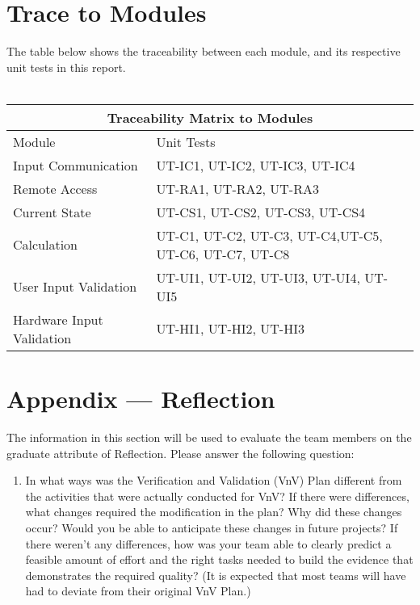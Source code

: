 \documentclass[12pt, titlepage]{article}
\begin{document}
\section{Trace to Modules}		
The table below shows the traceability between each module, and its respective unit tests in this report.\\
\\
\begin{tabular}{ |p{5cm}||p{5cm}| }
  \hline
  \multicolumn{2}{|c|}{Traceability Matrix to Modules} \\
  \hline
  Module & Unit Tests \\
  \hline
  Input Communication   & UT-IC1, UT-IC2, UT-IC3, UT-IC4  \\ \hline
  Remote Access   & UT-RA1, UT-RA2, UT-RA3   \\ \hline
  Current State   & UT-CS1, UT-CS2, UT-CS3, UT-CS4   \\ \hline
  Calculation   & UT-C1, UT-C2, UT-C3, UT-C4,UT-C5, UT-C6, UT-C7, UT-C8   \\ \hline
  User Input Validation  & UT-UI1, UT-UI2, UT-UI3, UT-UI4, UT-UI5   \\ \hline
  Hardware Input Validation  & UT-HI1, UT-HI2, UT-HI3  \\ \hline
  
 \end{tabular}


% 

\newpage{}
\section*{Appendix --- Reflection}

The information in this section will be used to evaluate the team members on the
graduate attribute of Reflection.  Please answer the following question:

\begin{enumerate}
  \item In what ways was the Verification and Validation (VnV) Plan different
  from the activities that were actually conducted for VnV?  If there were
  differences, what changes required the modification in the plan?  Why did
  these changes occur?  Would you be able to anticipate these changes in future projects?  If there weren't any differences, how was your team able to clearly predict a feasible amount of effort and the right tasks needed to build the evidence that demonstrates the required quality?  (It is expected that most teams will have had to deviate from their original VnV Plan.)
\end{enumerate}
\end{document}
